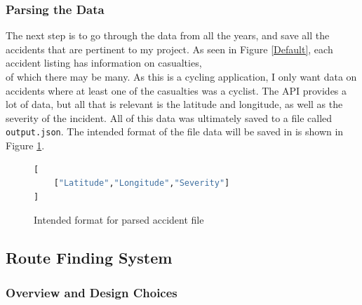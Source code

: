 \documentclass[11pt,twoside,a4paper]{article}
\begin{document}
\subsubsection{Parsing the Data}
The next step is to go through the data from all the years, and save all the accidents that are pertinent to my project. As seen in Figure \ref{Default}, each accident listing has information on casualties,\\
of which there may be many. As this is a cycling application, I only want data on accidents where at least one of the casualties was a cyclist. The API provides a lot of data, but all that is relevant is
the latitude and longitude, as well as the severity of the incident. All of this data was ultimately saved to a file called \texttt{output.json}.
 The intended format of the file data will be saved in is shown in Figure \ref{accident format}.
\begin{figure}[t]
\begin{lstlisting}[language=Python]
[
    ["Latitude","Longitude","Severity"]
]
\end{lstlisting}
\caption{Intended format for parsed accident file}
\label{accident format}
\end{figure}
\newpage
\subsection{Route Finding System}
\subsubsection{Overview and Design Choices}
\end{document}
